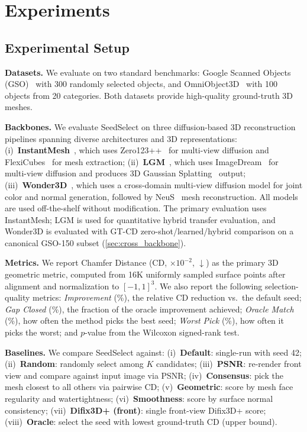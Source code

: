 \section{Experiments}
\label{sec:experiments}

\subsection{Experimental Setup}

\noindent\textbf{Datasets.}
We evaluate on two standard benchmarks: Google Scanned Objects (GSO)~\cite{gso} with 300 randomly selected objects, and OmniObject3D~\cite{omniobject3d} with 100 objects from 20 categories. Both datasets provide high-quality ground-truth 3D meshes.

\noindent\textbf{Backbones.}
We evaluate SeedSelect on three diffusion-based 3D reconstruction pipelines spanning diverse architectures and 3D representations:
(i)~\textbf{InstantMesh}~\cite{instantmesh}, which uses Zero123++~\cite{zero123plus} for multi-view diffusion and FlexiCubes~\cite{flexicubes} for mesh extraction;
(ii)~\textbf{LGM}~\cite{lgm}, which uses ImageDream~\cite{imagedream} for multi-view diffusion and produces 3D Gaussian Splatting~\cite{kerbl233d-gaussian} output;
(iii)~\textbf{Wonder3D}~\cite{wonder3d}, which uses a cross-domain multi-view diffusion model for joint color and normal generation, followed by NeuS~\cite{neus} mesh reconstruction.
All models are used off-the-shelf without modification. The primary evaluation uses InstantMesh; LGM is used for quantitative hybrid transfer evaluation, and Wonder3D is evaluated with GT-CD zero-shot/learned/hybrid comparison on a canonical GSO-150 subset (\cref{sec:cross_backbone}).

\noindent\textbf{Metrics.}
We report Chamfer Distance (CD, $\times 10^{-2}$, $\downarrow$) as the primary 3D geometric metric, computed from 16K uniformly sampled surface points after alignment and normalization to $[-1, 1]^3$. We also report the following selection-quality metrics: \emph{Improvement} (\%), the relative CD reduction vs.\ the default seed; \emph{Gap Closed} (\%), the fraction of the oracle improvement achieved; \emph{Oracle Match} (\%), how often the method picks the best seed; \emph{Worst Pick} (\%), how often it picks the worst; and $p$-value from the Wilcoxon signed-rank test.

\noindent\textbf{Baselines.}
We compare SeedSelect against: (i)~\textbf{Default}: single-run with seed 42; (ii)~\textbf{Random}: randomly select among $K$ candidates; (iii)~\textbf{PSNR}: re-render front view and compare against input image via PSNR; (iv)~\textbf{Consensus}: pick the mesh closest to all others via pairwise CD; (v)~\textbf{Geometric}: score by mesh face regularity and watertightness; (vi)~\textbf{Smoothness}: score by surface normal consistency; (vii)~\textbf{Difix3D+ (front)}: single front-view Difix3D+ score; (viii)~\textbf{Oracle}: select the seed with lowest ground-truth CD (upper bound).

